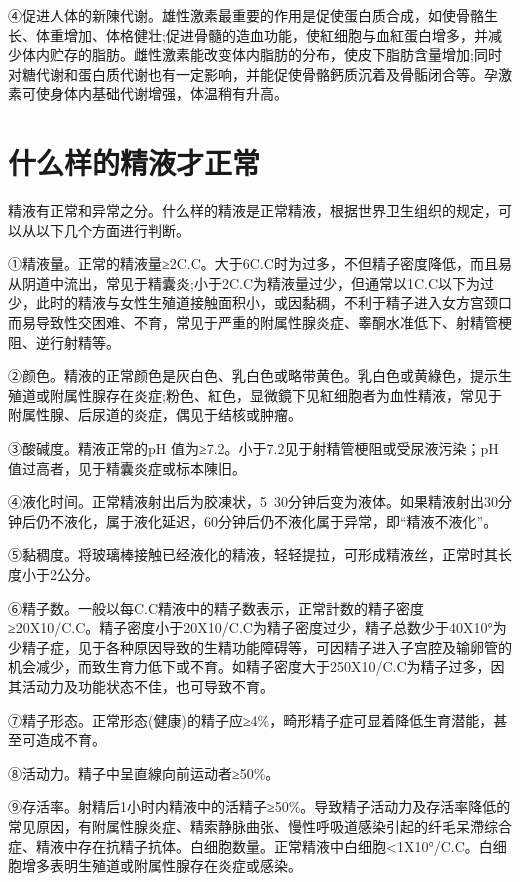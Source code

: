 \documentclass[12pt,UTF8]{ctexbook}
\begin{document}
④促进人体的新陳代谢。雄性激素最重要的作用是促使蛋白质合成，如使骨骼生长、体重增加、体格健壮;促进骨髓的造血功能，使紅细胞与血紅蛋白增多，并减少体内贮存的脂肪。雌性激素能改变体内脂肪的分布，使皮下脂肪含量增加;同时对糖代谢和蛋白质代谢也有一定影响，并能促使骨骼鈣质沉着及骨骺闭合等。孕激素可使身体内基础代谢增强，体温稍有升高。

\section{什么样的精液才正常}

精液有正常和异常之分。什么样的精液是正常精液，根据世界卫生组织的规定，可以从以下几个方面进行判断。

①精液量。正常的精液量≥2C.C。大于6C.C时为过多，不但精子密度降低，而且易从阴道中流出，常见于精囊炎;小于2C.C为精液量过少，但通常以1C.C以下为过少，此时的精液与女性生殖道接触面积小，或因黏稠，不利于精子进入女方宫颈口而易导致性交困难、不育，常见于严重的附属性腺炎症、睾酮水准低下、射精管梗阻、逆行射精等。

②颜色。精液的正常颜色是灰白色、乳白色或略带黄色。乳白色或黄綠色，提示生殖道或附属性腺存在炎症;粉色、紅色，显微鏡下见紅细胞者为血性精液，常见于附属性腺、后尿道的炎症，偶见于结核或肿瘤。

③酸碱度。精液正常的pH 值为≥7.2。小于7.2见于射精管梗阻或受尿液污染；pH值过高者，见于精囊炎症或标本陳旧。

④液化时间。正常精液射出后为胶凍状，5~30分钟后变为液体。如果精液射出30分钟后仍不液化，属于液化延迟，60分钟后仍不液化属于异常，即“精液不液化”。

⑤黏稠度。将玻璃棒接触已经液化的精液，轻轻提拉，可形成精液丝，正常时其长度小于2公分。

⑥精子数。一般以每C.C精液中的精子数表示，正常計数的精子密度≥20X10/C.C。精子密度小于20X10/C.C为精子密度过少，精子总数少于40X10°为少精子症，见于各种原因导致的生精功能障碍等，可因精子进入子宫腔及输卵管的机会减少，而致生育力低下或不育。如精子密度大于250X10/C.C为精子过多，因其活动力及功能状态不佳，也可导致不育。

⑦精子形态。正常形态(健康)的精子应≥4\%，畸形精子症可显着降低生育潜能，甚至可造成不育。

⑧活动力。精子中呈直線向前运动者≥50\%。

⑨存活率。射精后1小时内精液中的活精子≥50\%。导致精子活动力及存活率降低的常见原因，有附属性腺炎症、精索静脉曲张、慢性呼吸道感染引起的纤毛呆滯综合症、精液中存在抗精子抗体。白细胞数量。正常精液中白细胞<1X10°/C.C。白细胞增多表明生殖道或附属性腺存在炎症或感染。
\end{document}
